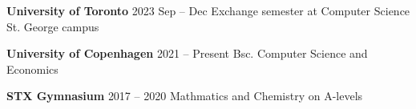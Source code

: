 \resumeSubHeadingListStart

  \resumeProjectHeading
  {\textbf{University of Toronto}\vspace{8pt} }{2023 Sep -- Dec}
  \small{Exchange semester at Computer Science St. George campus}

  \resumeProjectHeading
  {\textbf{University of Copenhagen} \vspace{8pt}}{2021 -- Present}
  \small{Bsc. Computer Science and Economics}

  \resumeProjectHeading
  {\textbf{STX Gymnasium} \vspace{8pt}}{2017 -- 2020}
  \small{Mathmatics and Chemistry on A-levels}

\resumeSubHeadingListEnd
